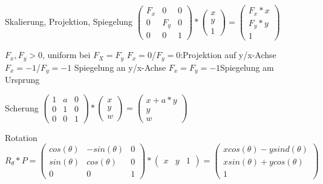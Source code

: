 \documentclass[landscape]{article}
\begin{document}
\begin{multicols}{3}
  \begin{description*}
    \item[Skalierung, Projektion, Spiegelung] $\begin{pmatrix} F_x & 0 & 0 \\ 0 & F_y & 0 \\ 0 & 0 & 1 \end{pmatrix} * \begin{pmatrix} x \\ y \\ 1 \end{pmatrix} = \begin{pmatrix} F_x*x \\ F_y*y \\ 1 \end{pmatrix}$
    
    $F_x,F_y>0$, uniform bei $F_X=F_y$\newline    
    $F_x=0$/$F_y=0$:Projektion auf y/x-Achse\newline    
    $F_x=-1$/$F_y=-1$ Spiegelung an y/x-Achse\newline    
    $F_x=F_y=-1$Spiegelung am Ursprung
    
    \item[Scherung] $\begin{pmatrix} 1 & a & 0 \\ 0 & 1 & 0 \\ 0 & 0 & 1 \end{pmatrix} * \begin{pmatrix} x \\ y \\ w \end{pmatrix} = \begin{pmatrix} x+a*y \\ y \\ w \end{pmatrix}$
    \item[Rotation] $R_\theta *P= \begin{pmatrix}cos(\theta) & -sin(\theta) & 0 \\ sin(\theta) & cos(\theta) & 0 \\ 0 & 0 & 1 \end{pmatrix} * \begin{pmatrix}x & y & 1 \end{pmatrix} = \begin{pmatrix} x cos(\theta) - y sind(\theta)\\ x sin(\theta)+y cos(\theta)\\ 1 \end{pmatrix}$
  \end{description*}
  

\end{multicols}
\end{document}
